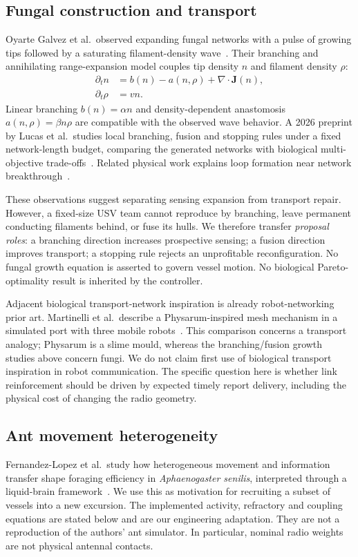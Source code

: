 \documentclass[10pt,a4paper,twocolumn]{article}
\newcommand{\1}{\mathbf 1}
\begin{document}
\subsection{Fungal construction and transport}
Oyarte Galvez et al.\ observed expanding fungal networks with a pulse of growing
tips followed by a saturating filament-density wave~\cite{oyarte2025}. Their
branching and annihilating range-expansion model couples tip density $n$ and
filament density $\rho$:
\begin{align}
 \partial_t n &= b(n)-a(n,\rho)+\nabla\cdot \bm J(n),\\
 \partial_t \rho &= vn .
\end{align}
Linear branching $b(n)=\alpha n$ and density-dependent anastomosis
$a(n,\rho)=\beta n\rho$ are compatible with the observed wave behavior.
A 2026 preprint by Lucas et al.\ studies local branching, fusion and stopping
rules under a fixed network-length budget, comparing the generated networks
with biological multi-objective trade-offs~\cite{lucas2026}. Related physical
work explains loop formation near network breakthrough~\cite{zukowski2024}.

These observations suggest separating sensing expansion from transport repair.
However, a fixed-size USV team cannot reproduce by branching, leave permanent
conducting filaments behind, or fuse its hulls. We therefore transfer
\emph{proposal roles}: a branching direction increases prospective sensing;
a fusion direction improves transport; a stopping rule rejects an unprofitable
reconfiguration. No fungal growth equation is asserted to govern vessel motion.
No biological Pareto-optimality result is inherited by the controller.

Adjacent biological transport-network inspiration is already robot-networking
prior art. Martinelli
et al.\ describe a Physarum-inspired mesh mechanism in a simulated port with
three mobile robots~\cite{martinelli2026}. This comparison concerns a transport
analogy; Physarum is a slime mould, whereas the branching/fusion growth studies
above concern fungi. We do not claim first use of biological transport
inspiration in robot communication. The specific question here is
whether link reinforcement should be driven by expected timely report delivery,
including the physical cost of changing the radio geometry.

\subsection{Ant movement heterogeneity}
Fernandez-Lopez et al.\ study how heterogeneous movement and information transfer
shape foraging efficiency in \emph{Aphaenogaster senilis}, interpreted through a
liquid-brain framework~\cite{fernandez2025}. We use this as motivation for
recruiting a subset of vessels into a new excursion. The implemented activity,
refractory and coupling equations are stated below and are our engineering
adaptation. They are not a reproduction of the authors' ant simulator.
In particular, nominal radio weights are not physical antennal contacts.
\end{document}
